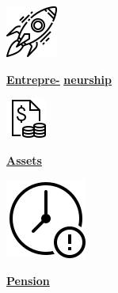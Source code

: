 \documentclass[
]{article}
\begin{document}
\begin{minipage}[c][4.2cm][t]{2.1cm}\begin{mybox}\centering

\vspace{.3cm}
\includegraphics[height=.75cm]{icon/entrepreneur.png}

\vspace{.3cm}
\fontsize{7.5}{1}\selectfont   
\textbf{\underline{\href{https://genderdata.worldbank.org/indicators/sg-law-indx-en}{Entrepre-}}}
\textbf{\underline{\href{https://genderdata.worldbank.org/indicators/sg-law-indx-en}{neurship}}}\normalsize 

\vspace{6pt}
\fontsize{15}{1}\selectfont 

\centering{}
\vspace{.3cm}
\normalsize\end{mybox}\end{minipage}
\begin{minipage}[c][4.2cm][t]{2.1cm}\begin{mybox}\centering
\vspace{.3cm}
\includegraphics[height=.75cm]{icon/assets.png}

\vspace{.45cm}
\fontsize{7.5}{1}\selectfont   
\textbf{\underline{\href{https://genderdata.worldbank.org/indicators/sg-law-indx-as}{Assets}}}
  
\normalsize 
\vspace{17pt}
\fontsize{14}{1}\selectfont 
\centering{}

\vspace{.3cm}
\normalsize\end{mybox}\end{minipage}
\begin{minipage}[c][4.2cm][t]{2.1cm}\begin{mybox}\centering

\vspace{.3cm}
\includegraphics[height=.75cm]{icon/pension.png}

\vspace{.3cm}
\fontsize{7.5}{1}\selectfont   
\textbf{\underline{\href{https://genderdata.worldbank.org/indicators/sg-law-indx-pe}{Pension}}}\normalsize 

\vspace{18pt}
\fontsize{14}{1}\selectfont 
\centering{}

\vspace{.3cm}
\normalsize\end{mybox}\end{minipage}
\end{document}
